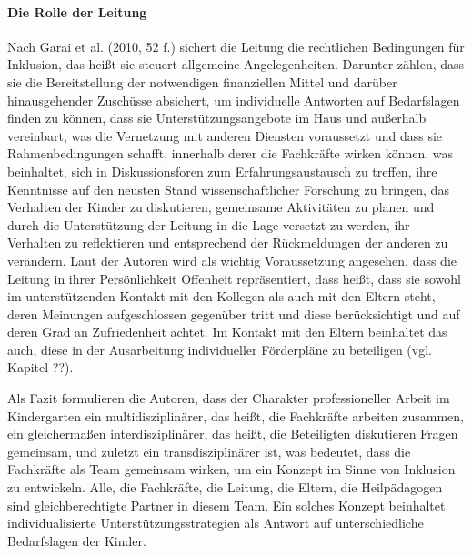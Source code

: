 \paragraph{Die Rolle der Leitung}
Nach Garai et al. (2010, 52 f.) sichert die Leitung die rechtlichen Bedingungen für Inklusion, das heißt sie steuert allgemeine Angelegenheiten. Darunter zählen, dass sie die Bereitstellung der notwendigen finanziellen Mittel und darüber hinausgehender Zuschüsse absichert, um individuelle Antworten auf Bedarfslagen finden zu können, dass sie Unterstützungsangebote im Haus und außerhalb vereinbart, was die Vernetzung mit anderen Diensten voraussetzt und dass sie Rahmenbedingungen schafft, innerhalb derer die Fachkräfte wirken können, was beinhaltet, sich in Diskussionsforen zum Erfahrungsaustausch zu treffen, ihre Kenntnisse auf den neusten Stand wissenschaftlicher Forschung zu bringen, das Verhalten der Kinder zu diskutieren, gemeinsame Aktivitäten zu planen und durch die Unterstützung der Leitung in die Lage versetzt zu werden, ihr Verhalten zu reflektieren und entsprechend der Rückmeldungen der anderen zu verändern. Laut der Autoren wird als wichtig Voraussetzung angesehen, dass die Leitung in ihrer Persönlichkeit Offenheit repräsentiert, dass heißt, dass sie sowohl im unterstützenden Kontakt mit den Kollegen als auch mit den Eltern steht, deren Meinungen aufgeschlossen gegenüber tritt und diese berücksichtigt und auf deren Grad an Zufriedenheit  achtet. Im Kontakt mit den Eltern beinhaltet das auch, diese in der Ausarbeitung individueller Förderpläne zu beteiligen (vgl. Kapitel ??).

Als Fazit formulieren die Autoren, dass der Charakter professioneller Arbeit im Kindergarten ein multidisziplinärer, das heißt, die Fachkräfte arbeiten zusammen, ein gleichermaßen interdisziplinärer, das heißt, die Beteiligten diskutieren Fragen gemeinsam, und zuletzt ein transdisziplinärer ist, was bedeutet, dass die Fachkräfte als Team gemeinsam wirken, um ein Konzept im Sinne von Inklusion zu entwickeln. Alle, die Fachkräfte, die Leitung, die Eltern, die Heilpädagogen sind gleichberechtigte Partner in diesem Team.  
Ein solches Konzept beinhaltet individualisierte Unterstützungsstrategien als Antwort auf unterschiedliche Bedarfslagen der Kinder.  

